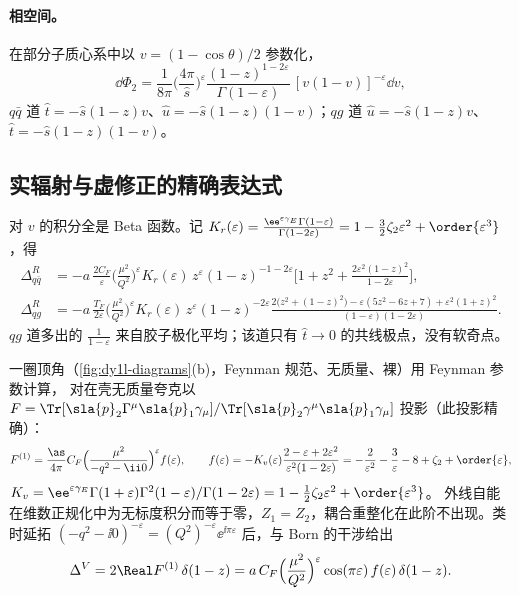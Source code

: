 \paragraph{相空间。}在部分子质心系中以 $v=(1-\cos\theta)/2$ 参数化，
\begin{equation}\label{eq:dy1l-ps}
\dd\Phi_2=\frac{1}{8\pi}\Big(\frac{4\pi}{\hat s}\Big)^{\varepsilon}\frac{(1-z)^{1-2\varepsilon}}{\Gamma(1-\varepsilon)}\,[v(1-v)]^{-\varepsilon}\dd v ,
\end{equation}
$q\bar q$ 道 $\hat t=-\hat s(1-z)v$、$\hat u=-\hat s(1-z)(1-v)$；$qg$ 道 $\hat u=-\hat s(1-z)v$、$\hat t=-\hat s(1-z)(1-v)$。

\subsection{实辐射与虚修正的精确表达式}
\label{sec:dy1l-exact}

对 $v$ 的积分全是 Beta 函数。记
$K_r(\varepsilon)=\frac{\ee^{\varepsilon\gamma_E}\Gamma(1-\varepsilon)}{\Gamma(1-2\varepsilon)}=1-\frac32\zeta_2\varepsilon^2+\order{\varepsilon^3}$，得
\begin{align}
\Delta^R_{q\bar q}&=-a\,\frac{2C_F}{\varepsilon}\Big(\frac{\mu^2}{Q^2}\Big)^{\varepsilon}K_r(\varepsilon)\,z^{\varepsilon}(1-z)^{-1-2\varepsilon}
\Big[1+z^2+\frac{2\varepsilon^2(1-z)^2}{1-2\varepsilon}\Big],\label{eq:dy1l-Rqq}\\
\Delta^R_{qg}&=-a\,\frac{T_F}{2\varepsilon}\Big(\frac{\mu^2}{Q^2}\Big)^{\varepsilon}K_r(\varepsilon)\,z^{\varepsilon}(1-z)^{-2\varepsilon}
\frac{2\big(z^2+(1-z)^2\big)-\varepsilon(5z^2-6z+7)+\varepsilon^2(1+z)^2}{(1-\varepsilon)(1-2\varepsilon)} .\label{eq:dy1l-Rqg}
\end{align}
$qg$ 道多出的 $\frac{1}{1-\varepsilon}$ 来自胶子极化平均；该道只有 $\hat t\to0$ 的共线极点，没有软奇点。

一圈顶角（\cref{fig:dy1l-diagrams}(b)，Feynman 规范、无质量、裸）用 Feynman 参数计算，
对在壳无质量夸克以 $F=\Tr[\sla{p}_2\Gamma^\mu\sla{p}_1\gamma_\mu]/\Tr[\sla{p}_2\gamma^\mu\sla{p}_1\gamma_\mu]$ 投影（此投影精确）：
\begin{equation}\label{eq:dy1l-ff}
F^{(1)}=\frac{\as}{4\pi}C_F\Big(\frac{\mu^2}{-q^2-\ii0}\Big)^{\varepsilon}f(\varepsilon),\qquad
f(\varepsilon)=-K_v(\varepsilon)\frac{2-\varepsilon+2\varepsilon^2}{\varepsilon^2(1-2\varepsilon)}=-\frac{2}{\varepsilon^2}-\frac{3}{\varepsilon}-8+\zeta_2+\order{\varepsilon},
\end{equation}
$K_v=\ee^{\varepsilon\gamma_E}\Gamma(1+\varepsilon)\Gamma^2(1-\varepsilon)/\Gamma(1-2\varepsilon)=1-\frac12\zeta_2\varepsilon^2+\order{\varepsilon^3}$。
外线自能在维数正规化中为无标度积分而等于零，$Z_1=Z_2$，耦合重整化在此阶不出现。类时延拓
$(-q^2-\ii0)^{-\varepsilon}=(Q^2)^{-\varepsilon}\ee^{\ii\pi\varepsilon}$ 后，与 Born 的干涉给出
\begin{equation}\label{eq:dy1l-V}
\Delta^V=2\Real F^{(1)}\,\delta(1-z)=a\,C_F\Big(\frac{\mu^2}{Q^2}\Big)^{\varepsilon}\cos(\pi\varepsilon)\,f(\varepsilon)\,\delta(1-z).
\end{equation}

